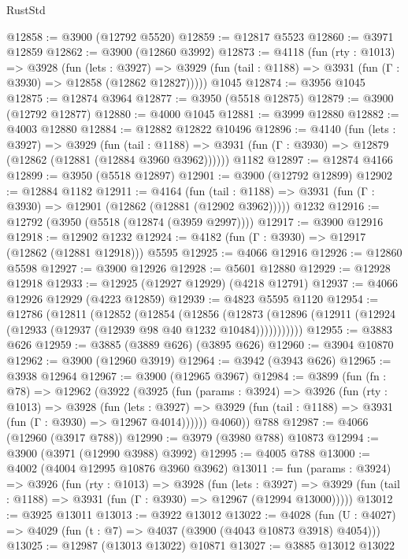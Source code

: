 \begin{lexlean}{RustStd}
\begin{coremodule}
@12858 := @3900 (@12792 @5520)
@12859 := @12817 @5523
@12860 := @3971 @12859
@12862 := @3900 (@12860 @3992)
@12873 := @4118
    (fun (rty : @1013) =>
    @3928
      (fun (lets : @3927) =>
      @3929 (fun (tail : @1188) => @3931 (fun (Γ : @3930) => @12858 (@12862 @12827)))))
    @1045
@12874 := @3956 @1045
@12875 := @12874 @3964
@12877 := @3950 (@5518 @12875)
@12879 := @3900 (@12792 @12877)
@12880 := @4000 @1045
@12881 := @3999 @12880
@12882 := @4003 @12880
@12884 := @12882 @12822 @10496
@12896 := @4140
    (fun (lets : @3927) =>
    @3929
      (fun (tail : @1188) =>
      @3931 (fun (Γ : @3930) => @12879 (@12862 (@12881 (@12884 @3960 @3962))))))
    @1182
@12897 := @12874 @4166
@12899 := @3950 (@5518 @12897)
@12901 := @3900 (@12792 @12899)
@12902 := @12884 @1182
@12911 := @4164
    (fun (tail : @1188) => @3931 (fun (Γ : @3930) => @12901 (@12862 (@12881 (@12902 @3962)))))
    @1232
@12916 := @12792 (@3950 (@5518 (@12874 (@3959 @2997))))
@12917 := @3900 @12916
@12918 := @12902 @1232
@12924 := @4182 (fun (Γ : @3930) => @12917 (@12862 (@12881 @12918))) @5595
@12925 := @4066 @12916
@12926 := @12860 @5598
@12927 := @3900 @12926
@12928 := @5601 @12880
@12929 := @12928 @12918
@12933 := @12925 (@12927 @12929) (@4218 @12791)
@12937 := @4066 @12926 @12929 (@4223 @12859)
@12939 := @4823 @5595 @1120
@12954 := @12786
    (@12811
      (@12852
        (@12854
          (@12856
            (@12873 (@12896 (@12911 (@12924 (@12933 (@12937 (@12939 @98 @40 @1232 @10484)))))))))))
@12955 := @3883 @626
@12959 := @3885 (@3889 @626) (@3895 @626)
@12960 := @3904 @10870
@12962 := @3900 (@12960 @3919)
@12964 := @3942 (@3943 @626)
@12965 := @3938 @12964
@12967 := @3900 (@12965 @3967)
@12984 := @3899
    (fun (fn : @78) =>
    @12962
      (@3922
        (@3925
          (fun (params : @3924) =>
          @3926
            (fun (rty : @1013) =>
            @3928
              (fun (lets : @3927) =>
              @3929 (fun (tail : @1188) => @3931 (fun (Γ : @3930) => @12967 @4014))))))
        @4060))
    @788
@12987 := @4066 (@12960 (@3917 @788))
@12990 := @3979 (@3980 @788) @10873
@12994 := @3900 (@3971 (@12990 @3988) @3992)
@12995 := @4005 @788
@13000 := @4002 (@4004 @12995 @10876 @3960 @3962)
@13011 := fun (params : @3924) =>
  @3926
    (fun (rty : @1013) =>
    @3928
      (fun (lets : @3927) =>
      @3929 (fun (tail : @1188) => @3931 (fun (Γ : @3930) => @12967 (@12994 @13000)))))
@13012 := @3925 @13011
@13013 := @3922 @13012
@13022 := @4028
    (fun (U : @4027) => @4029 (fun (t : @7) => @4037 (@3900 (@4043 @10873 @3918) @4054)))
@13025 := @12987 (@13013 @13022) @10871
@13027 := @3885 @13012 @13022

\end{coremodule}
\end{lexlean}
